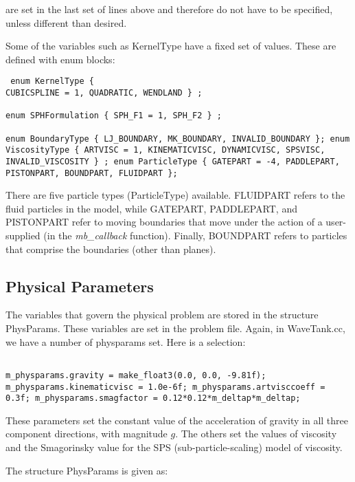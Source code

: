 \documentclass[12pt]{memoir}
\begin{document}
are set in the last set of lines above and therefore do not have to be
specified, unless different than desired.


Some of the variables such as KernelType have a fixed set of values.
These are defined with enum blocks: \begin{verbatim} enum KernelType {
CUBICSPLINE = 1, QUADRATIC, WENDLAND } ;

enum SPHFormulation { SPH_F1 = 1, SPH_F2 } ;

enum BoundaryType { LJ_BOUNDARY, MK_BOUNDARY, INVALID_BOUNDARY }; enum
ViscosityType { ARTVISC = 1, KINEMATICVISC, DYNAMICVISC, SPSVISC,
INVALID_VISCOSITY } ; enum ParticleType { GATEPART = -4, PADDLEPART,
PISTONPART, BOUNDPART, FLUIDPART }; \end{verbatim}

There are five particle types (ParticleType) available. FLUIDPART
refers to the fluid particles in the model, while GATEPART, PADDLEPART,
and PISTONPART refer to moving boundaries that move under the action of
a user-supplied (in the {\em mb\_callback} function). Finally,
BOUNDPART refers to particles that comprise the boundaries (other than
planes).

\subsection{Physical Parameters} The variables that govern the physical
problem are stored in the structure PhysParams. These variables are set
in the problem file. Again, in WaveTank.cc, we have a number of
physparams set. Here is a selection: \begin{verbatim}

m_physparams.gravity = make_float3(0.0, 0.0, -9.81f);
m_physparams.kinematicvisc = 1.0e-6f; m_physparams.artvisccoeff =
0.3f; m_physparams.smagfactor = 0.12*0.12*m_deltap*m_deltap;
\end{verbatim} These parameters set the constant value of the
acceleration of gravity in all three component directions, with
magnitude $g$. The others set the values of viscosity and the
Smagorinsky value for the SPS (sub-particle-scaling) model of viscosity.

The structure PhysParams is given as:
\end{document}
